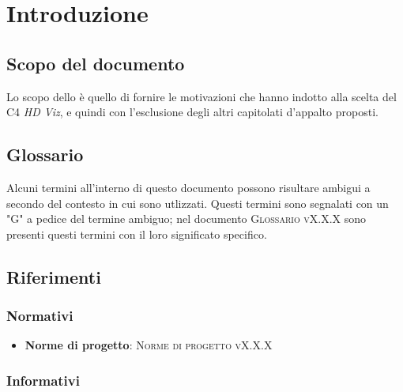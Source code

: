 \documentclass{article}
\begin{document}


\section{Introduzione}%
\label{sec:introduzione}

\subsection{Scopo del documento}%
\label{sub:scopo_del_documento}
Lo scopo dello \textsc{\placeholderTitle} è quello di fornire le motivazioni che hanno indotto alla scelta del  C4 \emph{HD Viz}, e quindi con l'esclusione degli altri capitolati d'appalto proposti.

\subsection{Glossario}%
\label{sub:glossario}
Alcuni termini all'interno di questo documento possono risultare ambigui a secondo del contesto in cui sono utlizzati.
Questi termini sono segnalati con un "G" a pedice del termine ambiguo; nel documento \textsc{Glossario vX.X.X} sono presenti questi termini con il loro significato specifico.


\subsection{Riferimenti}%
\label{sub:riferimenti}

\subsubsection{Normativi}%
\label{subs:normativi}

\begin{itemize}
  \item \textbf{Norme di progetto}: \textsc{Norme di progetto vX.X.X}
\end{itemize}

\subsubsection{Informativi}%
\label{subs:informativi}
\end{document}
